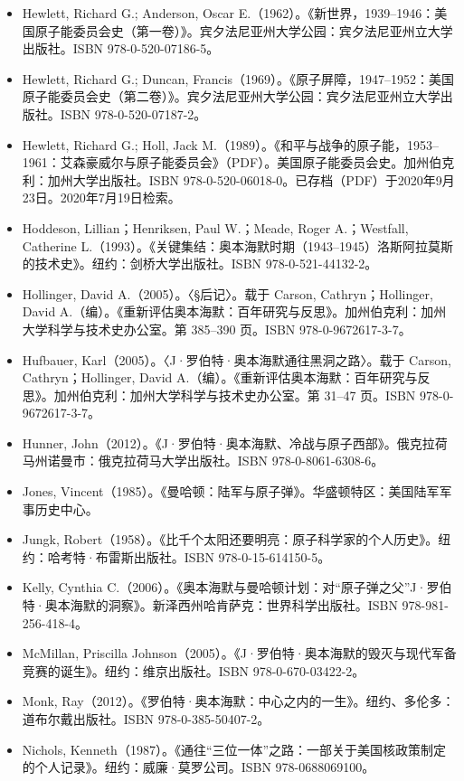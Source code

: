 \begin{itemize}
\item Hewlett, Richard G.; Anderson, Oscar E.（1962）。《新世界，1939–1946：美国原子能委员会史（第一卷）》。宾夕法尼亚州大学公园：宾夕法尼亚州立大学出版社。ISBN 978-0-520-07186-5。
\item Hewlett, Richard G.; Duncan, Francis（1969）。《原子屏障，1947–1952：美国原子能委员会史（第二卷）》。宾夕法尼亚州大学公园：宾夕法尼亚州立大学出版社。ISBN 978-0-520-07187-2。
\item Hewlett, Richard G.; Holl, Jack M.（1989）。《和平与战争的原子能，1953–1961：艾森豪威尔与原子能委员会》（PDF）。美国原子能委员会史。加州伯克利：加州大学出版社。ISBN 978-0-520-06018-0。已存档（PDF）于2020年9月23日。2020年7月19日检索。
\item Hoddeson, Lillian；Henriksen, Paul W.；Meade, Roger A.；Westfall, Catherine L.（1993）。《关键集结：奥本海默时期（1943–1945）洛斯阿拉莫斯的技术史》。纽约：剑桥大学出版社。ISBN 978-0-521-44132-2。
\item Hollinger, David A.（2005）。〈§后记〉。载于 Carson, Cathryn；Hollinger, David A.（编）。《重新评估奥本海默：百年研究与反思》。加州伯克利：加州大学科学与技术史办公室。第 385–390 页。ISBN 978-0-9672617-3-7。
\item Hufbauer, Karl（2005）。〈J·罗伯特·奥本海默通往黑洞之路〉。载于 Carson, Cathryn；Hollinger, David A.（编）。《重新评估奥本海默：百年研究与反思》。加州伯克利：加州大学科学与技术史办公室。第 31–47 页。ISBN 978-0-9672617-3-7。
\item Hunner, John（2012）。《J·罗伯特·奥本海默、冷战与原子西部》。俄克拉荷马州诺曼市：俄克拉荷马大学出版社。ISBN 978-0-8061-6308-6。
\item Jones, Vincent（1985）。《曼哈顿：陆军与原子弹》。华盛顿特区：美国陆军军事历史中心。
\item Jungk, Robert（1958）。《比千个太阳还要明亮：原子科学家的个人历史》。纽约：哈考特·布雷斯出版社。ISBN 978-0-15-614150-5。
\item Kelly, Cynthia C.（2006）。《奥本海默与曼哈顿计划：对“原子弹之父”J·罗伯特·奥本海默的洞察》。新泽西州哈肯萨克：世界科学出版社。ISBN 978-981-256-418-4。
\item McMillan, Priscilla Johnson（2005）。《J·罗伯特·奥本海默的毁灭与现代军备竞赛的诞生》。纽约：维京出版社。ISBN 978-0-670-03422-2。
\item Monk, Ray（2012）。《罗伯特·奥本海默：中心之内的一生》。纽约、多伦多：道布尔戴出版社。ISBN 978-0-385-50407-2。
\item Nichols, Kenneth（1987）。《通往“三位一体”之路：一部关于美国核政策制定的个人记录》。纽约：威廉·莫罗公司。ISBN 978-0688069100。

\end{itemize}
